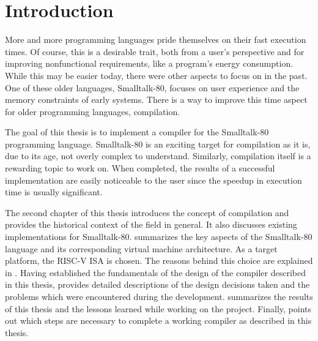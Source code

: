 \chapter{Introduction}
More and more programming languages pride themselves on their fast execution times. Of course, this is a desirable trait, both from a user's perspective and for improving nonfunctional requirements, like a program's energy consumption. 
While this may be easier today, there were other aspects to focus on in the past. 
One of these older languages, Smalltalk-80, focuses on user experience and the memory constraints of early systems.
There is a way to improve this time aspect for older programming languages, \jit{} compilation.

The goal of this thesis is to implement a \jit{} compiler for the Smalltalk-80 programming language.
Smalltalk-80 is an exciting target for \jit{} compilation as it is, due to its age, not overly complex to understand.
Similarly, \jit{} compilation itself is a rewarding topic to work on. When completed, the results of a successful implementation are easily noticeable to the user since the speedup in execution time is usually significant.

The second chapter of this thesis introduces the concept of \jit{} compilation and provides the historical context of the field in general. It also discusses existing \jit{} implementations for Smalltalk-80. 
 summarizes the key aspects of the Smalltalk-80 language and its corresponding virtual machine architecture. 
As a target platform, the RISC-V ISA is chosen. The reasons behind this choice are explained in .
Having established the fundamentals of the design of the \jit{} compiler described in this thesis,  provides detailed descriptions of the design decisions taken and the problems which were encountered during the development. 
 summarizes the results of this thesis and the lessons learned while working on the project. 
Finally,  points out which steps are necessary to complete a working \jit{} compiler as described in this thesis.
